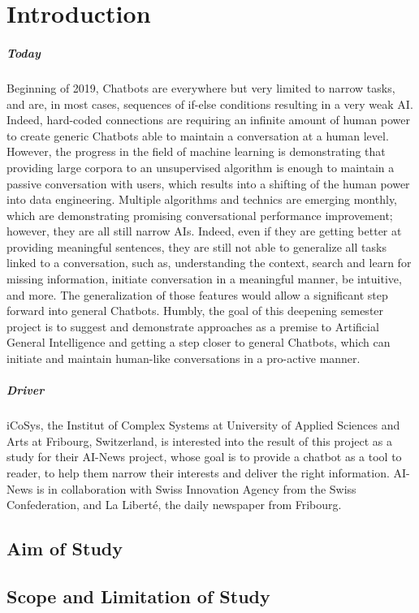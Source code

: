 \chapter{Introduction}
\label{chap:introduction}

\paragraph{Today} Beginning of 2019, Chatbots are everywhere but very limited to narrow tasks, and are, in most cases, sequences of if-else conditions resulting in a very weak AI. Indeed, hard-coded connections are requiring an infinite amount of human power to create generic Chatbots able to maintain a conversation at a human level. However, the progress in the field of machine learning is demonstrating that providing large corpora to an unsupervised algorithm is enough to maintain a passive conversation with users, which results into a shifting of the human power into data engineering. Multiple algorithms and technics are emerging monthly, which are demonstrating promising conversational performance improvement; however, they are all still narrow AIs. Indeed, even if they are getting better at providing meaningful sentences, they are still not able to generalize all tasks linked to a conversation, such as, understanding the context, search and learn for missing information, initiate conversation in a meaningful manner, be intuitive, and more. The generalization of those features would allow a significant step forward into general Chatbots. Humbly, the goal of this deepening semester project is to suggest and demonstrate approaches as a premise to Artificial General Intelligence and getting a step closer to general Chatbots, which can initiate and maintain human-like conversations in a pro-active manner. 
\paragraph{Driver} iCoSys, the Institut of Complex Systems at University of Applied Sciences and Arts at Fribourg, Switzerland, is interested into the result of this project as a study for their AI-News project, whose goal is to provide a chatbot as a tool to reader, to help them narrow their interests and deliver the right information. AI-News is in collaboration with Swiss Innovation Agency from the Swiss Confederation, and La Liberté, the daily newspaper from Fribourg.

\section{Aim of Study}

\section{Scope and Limitation of Study}
